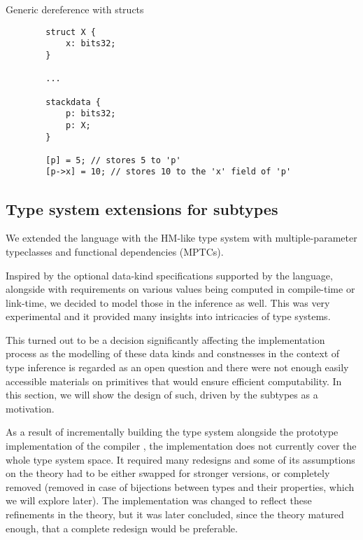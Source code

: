 \begin{codex}
    \caption{Generic dereference with structs}
    \label{cex:genDeref}
    \begin{lstlisting}
        struct X {
            x: bits32;
        }

        ...

        stackdata {
            p: bits32;
            p: X;
        }

        [p] = 5; // stores 5 to 'p'
        [p->x] = 10; // stores 10 to the 'x' field of 'p'
    \end{lstlisting}
\end{codex}

\subsection{Type system extensions for \cmm subtypes}
\label{sec:typesystem}

We extended the language with the HM-like type system with multiple-parameter typeclasses and functional dependencies (MPTCs).

Inspired by the optional data-kind specifications supported by the \cmm language, alongside with requirements on various values being computed in compile-time or link-time, we decided to model those in the inference as well. This was very experimental and it provided many insights into intricacies of type systems.

This turned out to be a decision significantly affecting the implementation process as the modelling of these data kinds and constnesses in the context of type inference is regarded as an open question and there were not enough easily accessible materials on primitives that would ensure efficient computability. In this section, we will show the design of such, driven by the \cmm subtypes as a motivation.

As a result of incrementally building the type system alongside the prototype implementation of the compiler \cite{klepl2022compiler}, the implementation does not currently cover the whole type system space. It required many redesigns and some of its assumptions on the theory had to be either swapped for stronger versions, or completely removed (removed in case of bijections between types and their properties, which we will explore later). The implementation was changed to reflect these refinements in the theory, but it was later concluded, since the theory matured enough, that a complete redesign would be preferable.

